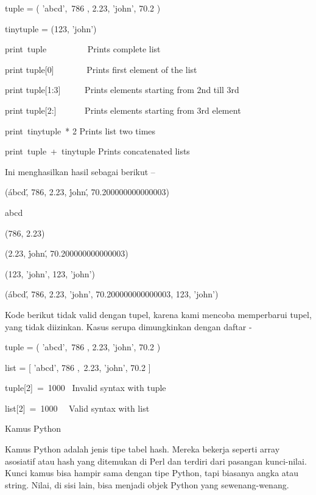 \vspace{12pt}
\noindent 
tuple = ( 'abcd',~786 , 2.23, 'john', 70.2  ) \par
\noindent 
tinytuple = (123, 'john') \par
\vspace{12pt}
\noindent 
print~tuple~~~~~~~~~   Prints complete list \par
\noindent 
print tuple[0]~~~~~~~  Prints first element of the list \par
\noindent 
print tuple[1:3]~~~~~  Prints elements starting from 2nd till 3rd  \par
\noindent 
print tuple[2:]~~~~~~  Prints elements starting from 3rd element \par
\noindent 
print~tinytuple~* 2    Prints list two times \par
\noindent 
print~tuple~+~tinytuple     Prints concatenated lists \par
\vspace{12pt}
\noindent 
Ini menghasilkan hasil sebagai berikut – \par
\vspace{12pt}
\noindent 
(\'abcd\', 786, 2.23, \'john\', 70.200000000000003) \par
\noindent 
abcd \par
\noindent 
(786, 2.23) \par
\noindent 
(2.23, \'john\', 70.200000000000003) \par
\noindent 
(123, 'john', 123, 'john') \par
\noindent 
(\'abcd\', 786, 2.23, 'john', 70.200000000000003, 123, 'john') \par
\vspace{12pt}
\noindent 
Kode berikut tidak valid dengan tupel, karena kami mencoba memperbarui tupel, yang tidak diizinkan. $  $Kasus serupa dimungkinkan dengan daftar - \par
\vspace{12pt}
\noindent 
tuple = ( 'abcd',~786 , 2.23, 'john', 70.2  ) \par
\noindent 
list = [ 'abcd', 786 ,~2.23, 'john', 70.2  ] \par
\noindent 
tuple[2]~=~1000~    Invalid syntax with tuple \par
\noindent 
list[2]~=~1000~~    Valid syntax with list \par
\vspace{12pt}
\noindent 
Kamus Python \par
\vspace{12pt}
\noindent 
Kamus Python adalah jenis tipe tabel hash. $  $Mereka bekerja seperti array asosiatif atau hash yang ditemukan di Perl dan terdiri dari pasangan kunci-nilai. $  $Kunci kamus bisa hampir sama dengan tipe Python, tapi biasanya angka atau string. $  $Nilai, di sisi lain, bisa menjadi objek Python yang sewenang-wenang. \par

